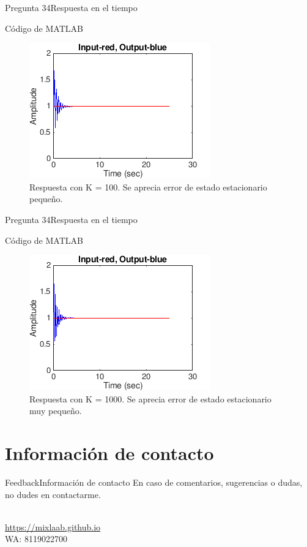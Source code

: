 \documentclass[10pt]{beamer}
\newcommand{\chref}[2]{%
  \href{#1}{{\usebeamercolor[bg]{Aalborg}#2}}%
}
\begin{document}
\begin{frame}{Pregunta 34}{Respuesta en el tiempo}
\begin{block}{Código de MATLAB}
\begin{figure}[h!]
\centering
\includegraphics [scale=0.6]{fig3}
\caption{Respuesta con K = 100. Se aprecia error de estado estacionario pequeño.}
\end{figure}
\end{block}
\end{frame}

\begin{frame}{Pregunta 34}{Respuesta en el tiempo}
\begin{block}{Código de MATLAB}
\begin{figure}[h!]
\centering
\includegraphics [scale=0.6]{fig4}
\caption{Respuesta con K = 1000. Se aprecia error de estado estacionario muy pequeño.}
\end{figure}
\end{block}
\end{frame}

\section{Información de contacto}
\begin{frame}{Feedback}{Información de contacto}
En caso de comentarios, sugerencias o dudas, no dudes en contactarme.
  \begin{center}
    \insertauthor\\
    \chref{https://mixlaab.github.io}{https://mixlaab.github.io}\\
    WA: 8119022700\\
  \end{center}
\end{frame}

{\aauwavesbg%
\begin{frame}%
\end{frame}}
\end{document}
